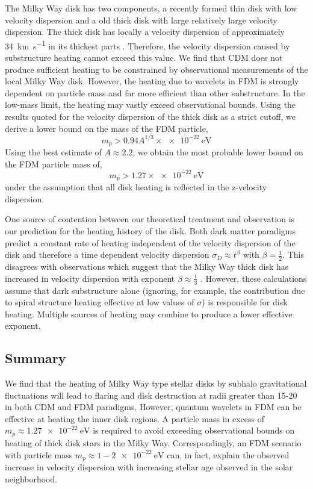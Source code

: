 \documentclass[usenatbib]{mnras}
\begin{document}
The Milky Way disk has two components, a recently formed thin disk with low velocity dispersion and a old thick disk with large relatively large velocity dispersion. The thick disk has locally a velocity dispersion of approximately \SI{34}{\kilo\meter\per\second} in its thickest parts \citep{milky_way}. Therefore, the velocity dispersion caused by substructure heating cannot exceed this value. We find that CDM does not produce sufficient heating to be constrained by observational measurements of the local  Milky Way disk. However, the heating due to wavelets in FDM is strongly dependent on particle mass and far more efficient than other substructure. In the low-mass limit, the heating may vastly exceed observational bounds. Using the results quoted for the velocity dispersion of the thick disk as a strict cutoff, we derive a lower bound on the mass of the FDM particle,
\begin{equation}
m_p > 0.94 A^{1/3} \times \SI{e-22}{\electronvolt}
\end{equation}
Using the best estimate of $A \approx 2.2$, we obtain the most probable lower bound on the FDM particle mass of,
\[ m_p > 1.27 \times \SI{e-22}{\electronvolt} \]
under the assumption that all disk heating is reflected in the z-velocity dispersion.
\par
One source of contention between our theoretical treatment and observation is our prediction for the heating history of the disk. Both dark matter paradigms predict a constant rate of heating independent of the velocity dispersion of the disk and therefore a time dependent velocity dispersion $\sigma_D \approx t^{\beta}$ with $\beta = \tfrac{1}{2}$. This disagrees with observations which suggest that the Milky Way thick disk has increased in velocity dispersion with exponent $\beta \approx \tfrac{1}{3}$ \citep{heating_history}. However, these calculations assume that dark substructure alone (ignoring, for example, the contribution due to spiral structure heating effective at low values of $\sigma$) is responsible for disk heating. Multiple sources of heating may combine to produce a lower effective exponent. 


\subsection{Summary}
We find that the heating of Milky Way type stellar disks by subhalo gravitational fluctuations will lead to flaring and disk destruction at radii greater than 15-\SI{20}{\kilo\parsec} in both CDM and FDM paradigms. However, quantum wavelets in FDM can be effective at heating the inner disk regions. A particle mass in excess of $m_p \approx \SI{1.27 e-22}{\electronvolt}$ is required to avoid exceeding observational bounds on heating of thick disk stars in the Milky Way. Correspondingly, an FDM scenario with particle mass $m_p \approx 1-\SI{2e-22}{\electronvolt}$ can, in fact, explain the observed increase in velocity dispersion with increasing stellar age observed in the solar neighborhood.    
\end{document}
